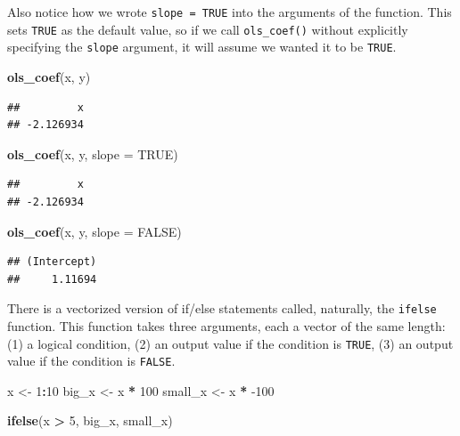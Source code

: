 \documentclass[12pt,oneside,openany]{book}
\newenvironment{Shaded}{\begin{snugshade}}{\end{snugshade}}
\newcommand{\KeywordTok}[1]{\textcolor[rgb]{0.13,0.29,0.53}{\textbf{#1}}}
\newcommand{\DataTypeTok}[1]{\textcolor[rgb]{0.13,0.29,0.53}{#1}}
\newcommand{\DecValTok}[1]{\textcolor[rgb]{0.00,0.00,0.81}{#1}}
\newcommand{\StringTok}[1]{\textcolor[rgb]{0.31,0.60,0.02}{#1}}
\newcommand{\OtherTok}[1]{\textcolor[rgb]{0.56,0.35,0.01}{#1}}
\newcommand{\OperatorTok}[1]{\textcolor[rgb]{0.81,0.36,0.00}{\textbf{#1}}}
\newcommand{\NormalTok}[1]{#1}
\begin{document}
Also notice how we wrote \texttt{slope\ =\ TRUE} into the arguments of
the function. This sets \texttt{TRUE} as the default value, so if we
call \texttt{ols\_coef()} without explicitly specifying the
\texttt{slope} argument, it will assume we wanted it to be
\texttt{TRUE}.

\begin{Shaded}
\begin{Highlighting}[]
\KeywordTok{ols_coef}\NormalTok{(x, y)}
\end{Highlighting}
\end{Shaded}

\begin{verbatim}
##         x 
## -2.126934
\end{verbatim}

\begin{Shaded}
\begin{Highlighting}[]
\KeywordTok{ols_coef}\NormalTok{(x, y, }\DataTypeTok{slope =} \OtherTok{TRUE}\NormalTok{)}
\end{Highlighting}
\end{Shaded}

\begin{verbatim}
##         x 
## -2.126934
\end{verbatim}

\begin{Shaded}
\begin{Highlighting}[]
\KeywordTok{ols_coef}\NormalTok{(x, y, }\DataTypeTok{slope =} \OtherTok{FALSE}\NormalTok{)}
\end{Highlighting}
\end{Shaded}

\begin{verbatim}
## (Intercept) 
##     1.11694
\end{verbatim}

There is a vectorized version of if/else statements called, naturally,
the \texttt{ifelse} function. This function takes three arguments, each
a vector of the same length: (1) a logical condition, (2) an output
value if the condition is \texttt{TRUE}, (3) an output value if the
condition is \texttt{FALSE}.

\begin{Shaded}
\begin{Highlighting}[]
\NormalTok{x <-}\StringTok{ }\DecValTok{1}\OperatorTok{:}\DecValTok{10}
\NormalTok{big_x <-}\StringTok{ }\NormalTok{x }\OperatorTok{*}\StringTok{ }\DecValTok{100}
\NormalTok{small_x <-}\StringTok{ }\NormalTok{x }\OperatorTok{*}\StringTok{ }\DecValTok{-100}

\KeywordTok{ifelse}\NormalTok{(x }\OperatorTok{>}\StringTok{ }\DecValTok{5}\NormalTok{, big_x, small_x)}
\end{Highlighting}
\end{Shaded}
\end{document}
